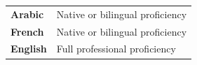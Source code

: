 %
%
%

\vspace*{.5em}
\begin{tabular}{@{} l l @{}}
\textbf{Arabic} & Native or bilingual proficiency \\
\textbf{French} & Native or bilingual proficiency \\
\textbf{English} & Full professional proficiency \\
\end{tabular}




